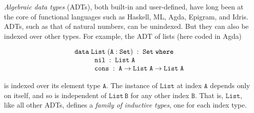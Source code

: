 \documentclass[runningheads]{llncs}
\begin{document}
\vspace*{-0.1in}

{\em Algebraic data types} (ADTs), both built-in and user-defined,
have long been at the core of functional languages such as Haskell,
ML, Agda, Epigram, and Idris. ADTs, such as that of natural numbers,
can be unindexed. But they can also be indexed over other types. For
example, the ADT of lists (here coded in Agda)

{\small
\[\begin{array}{l}
\mathtt{data\; List \;(A : Set)\;:\;Set\;where}\\
\hspace*{0.4in}\mathtt{nil\;:\; List\;A}\\
\hspace*{0.4in}\mathtt{cons\;:\;A \rightarrow List\;A \rightarrow List\;A}
\end{array}\]}

\noindent
is indexed over its element type $\mathtt{A}$.  The instance of
$\mathtt{List}$ at index $\mathtt{A}$ depends only on itself, and so is
independent of $\mathtt{List\,B}$ for any other index $\mathtt{B}$.
That is, $\mathtt{List}$, like all other ADTs, defines a {\em family
  of inductive types}, one for each index type.
\end{document}
